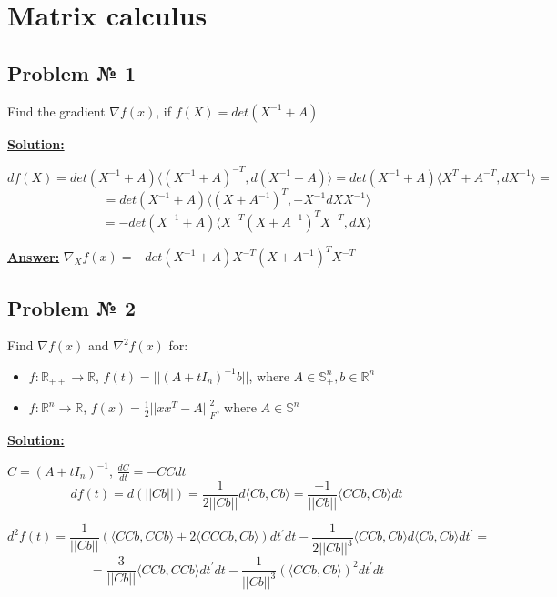 \section{Matrix calculus}

\subsection{Problem № 1} Find the gradient $\nabla f(x)$, if $f(X) = det \left( X^{-1} + A \right)$

\underline{\textbf{Solution:}}

\begin{equation*}
    df(X) = det \left(X^{-1} + A \right) \langle (X^{-1} + A)^{-T}, d(X^{-1} + A) \rangle = det \left(X^{-1} + A \right) \langle X^{T} + A^{-T}, dX^{-1} \rangle =
\end{equation*}
\begin{equation*}
    = det \left(X^{-1} + A \right) \langle (X + A^{-1})^T, -X^{-1}dX X^{-1} \rangle 
\end{equation*}
\begin{equation*}
    = -det \left(X^{-1} + A \right) \langle X^{-T}(X + A^{-1})^TX^{-T}, dX \rangle
\end{equation*}

\underline{\textbf{Answer:}} $\nabla_X f(x) = -det \left(X^{-1} + A \right) X^{-T}(X + A^{-1})^TX^{-T}$

\subsection{Problem № 2} 
Find $\nabla f(x)$ and $\nabla^2 f(x)$ for:
\begin{itemize}
    \item $f: \mathbb{R}_{++} \xrightarrow{} \mathbb{R}$, $f(t) = ||(A+tI_n)^{-1}b||$, where $A \in \mathbb{S}_{+}^n, b \in \mathbb{R}^n$
    \item $f: \mathbb{R}^{n} \xrightarrow{} \mathbb{R}$, $f(x) = \frac{1}{2}||xx^T-A||_F^2$, where $A \in \mathbb{S}^n$
\end{itemize}
\underline{\textbf{Solution:}}

$C = (A+tI_n)^{-1}$, $\frac{dC}{dt} = -CCdt$
\begin{equation*}
    df(t) = d(||Cb||) = \frac{1}{2||Cb||} d\langle Cb, Cb \rangle = \frac{-1}{||Cb||} \langle CCb, Cb \rangle dt
\end{equation*}

\begin{equation*}
    d^2f(t) = \frac{1}{||Cb||}\left(\langle CCb, CCb\rangle + 2\langle CCCb, Cb\rangle\right)dt^'dt - \frac{1}{2||Cb||^{3}} \langle CCb, Cb \rangle d \langle Cb, Cb \rangle dt^' = 
\end{equation*}
\begin{equation*}
     = \frac{3}{||Cb||}\langle CCb, CCb\rangle dt^'dt - \frac{1}{||Cb||^{3}} (\langle CCb, Cb \rangle)^2dt^'dt
\end{equation*}

